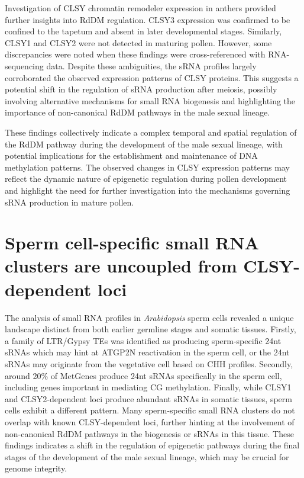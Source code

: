 Investigation of CLSY chromatin remodeler expression in anthers provided further insights into RdDM regulation. CLSY3 expression was confirmed to be confined to the tapetum and absent in later developmental stages. Similarly, CLSY1 and CLSY2 were not detected in maturing pollen. However, some discrepancies were noted when these findings were cross-referenced with RNA-sequencing data. Despite these ambiguities, the sRNA profiles largely corroborated the observed expression patterns of CLSY proteins. This suggests a potential shift in the regulation of sRNA production after meiosis, possibly involving alternative mechanisms for small RNA biogenesis and highlighting the importance of non-canonical RdDM pathways in the male sexual lineage.

These findings collectively indicate a complex temporal and spatial regulation of the RdDM pathway during the development of the male sexual lineage, with potential implications for the establishment and maintenance of DNA methylation patterns. The observed changes in CLSY expression patterns may reflect the dynamic nature of epigenetic regulation during pollen development and highlight the need for further investigation into the mechanisms governing sRNA production in mature pollen.

\section{Sperm cell-specific small RNA clusters are uncoupled from CLSY-dependent loci}

The analysis of small RNA profiles in \textit{Arabidopsis} sperm cells revealed a unique landscape distinct from both earlier germline stages and somatic tissues. Firstly, a family of LTR/Gypsy TEs was identified as producing sperm-specific 24nt sRNAs which may hint at ATGP2N reactivation in the sperm cell, or the 24nt sRNAs may originate from the vegetative cell based on CHH profiles. Secondly, around 20\% of MetGenes produce 24nt sRNAs specifically in the sperm cell, including genes important in mediating CG methylation. Finally, while CLSY1 and CLSY2-dependent loci produce abundant sRNAs in somatic tissues, sperm cells exhibit a different pattern. Many sperm-specific small RNA clusters do not overlap with known CLSY-dependent loci, further hinting at the involvement of non-canonical RdDM pathways in the biogenesis or sRNAs in this tissue. These findings indicates a shift in the regulation of epigenetic pathways during the final stages of the development of the male sexual lineage, which may be crucial for genome integrity. 

